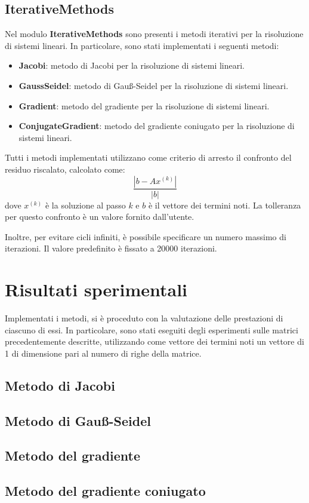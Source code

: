 \documentclass{article}
\begin{document}
\subsection{IterativeMethods}
Nel modulo \textbf{IterativeMethods} sono presenti i metodi iterativi per la
risoluzione di sistemi lineari. In particolare, sono stati implementati i seguenti
metodi:
\begin{itemize}
    \item \textbf{Jacobi}: metodo di Jacobi per la risoluzione di sistemi lineari.
    \item \textbf{GaussSeidel}: metodo di Gauß-Seidel per la risoluzione di
          sistemi lineari.
    \item \textbf{Gradient}: metodo del gradiente per la risoluzione di sistemi
          lineari.
    \item \textbf{ConjugateGradient}: metodo del gradiente coniugato per la
          risoluzione di sistemi lineari.
\end{itemize}

Tutti i metodi implementati utilizzano come criterio di arresto il confronto del
residuo riscalato, calcolato come:
\begin{equation}
    \frac{|b - Ax^{(k)}|}{|b|}
\end{equation}
dove $x^{(k)}$ è la soluzione al passo $k$ e $b$ è il vettore dei termini noti.
La tolleranza per questo confronto è un valore fornito dall'utente.

Inoltre, per evitare cicli infiniti, è possibile specificare un numero massimo
di iterazioni. Il valore predefinito è fissato a 20000 iterazioni.

\section{Risultati sperimentali}
Implementati i metodi, si è proceduto con la valutazione delle prestazioni di
ciascuno di essi. In particolare, sono stati eseguiti degli esperimenti sulle 
matrici precedentemente descritte, utilizzando come vettore dei termini noti un
vettore di 1 di dimensione pari al numero di righe della matrice.


\subsection{Metodo di Jacobi}
\subsection{Metodo di Gauß-Seidel}
\subsection{Metodo del gradiente}
\subsection{Metodo del gradiente coniugato}
\end{document}

